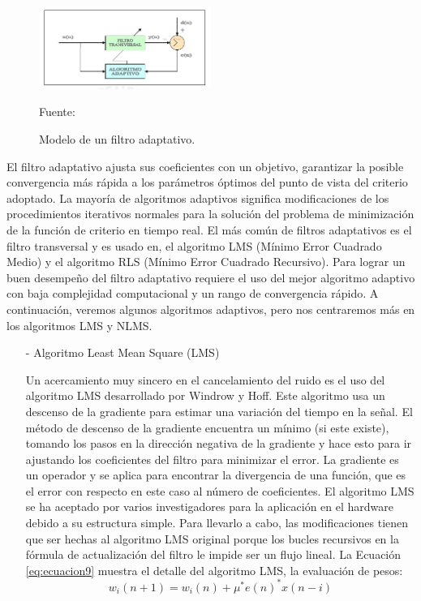 \begin{enumerate}
\begin{enumerate}
\begin{figure}[ht]
\begin{center}
\includegraphics[width=0.5\textwidth]{Imagenes/Cap2/image018}
\end{center}
\begin{center}
\vskip -0.5cm
\caption{\small{Modelo de un filtro adaptativo.}}
\label{fig:figura2.18}
{\small{Fuente: \cite{simon}}}
\end{center}
\end{figure}

El filtro adaptativo ajusta sus coeficientes con un objetivo, garantizar la posible convergencia más rápida a los parámetros óptimos del punto de vista del criterio adoptado. La mayoría de algoritmos adaptivos significa modificaciones de los procedimientos iterativos normales para la solución del problema de minimización de la función de criterio en tiempo real. El más común de filtros adaptativos es el filtro transversal y es usado en, el algoritmo LMS (Mínimo Error Cuadrado Medio) y el algoritmo RLS (Mínimo Error Cuadrado Recursivo). Para lograr un buen desempeño del filtro adaptativo requiere el uso del mejor algoritmo adaptivo con baja complejidad computacional y un rango de convergencia rápido. A continuación, veremos algunos algoritmos adaptivos, pero nos centraremos más en los algoritmos LMS y NLMS.

\begin{enumerate}
\item[-]Algoritmo Least Mean Square (LMS)
\par
Un acercamiento muy sincero en el cancelamiento del ruido es el uso del algoritmo LMS desarrollado por Windrow y Hoff. Este algoritmo usa un descenso de la gradiente para estimar una variación del tiempo en la señal. El método de descenso de la gradiente encuentra un mínimo (si este existe), tomando los pasos en la dirección negativa de la gradiente y hace esto para ir ajustando los coeficientes del filtro para minimizar el error. La gradiente es un operador y se aplica para encontrar la divergencia de una función, que es el error con respecto en este caso al número de coeficientes. 
\vskip 0.5cm
El algoritmo LMS se ha aceptado por varios investigadores para la aplicación en el hardware debido a su estructura simple. Para llevarlo a cabo, las modificaciones tienen que ser hechas al algoritmo LMS original porque los bucles recursivos en la fórmula de actualización del filtro le impide ser un flujo lineal.
\vskip 0.5cm
La Ecuación \ref{eq:ecuacion9} muestra el detalle del algoritmo LMS, la evaluación de pesos:
\begin{equation}
\label{eq:ecuacion9}
w_{i}(n+1) = w_{i}(n) + \mu^{*}e(n)^{*}x(n-i)
\end{equation}


\end{enumerate}
\end{enumerate}
\end{enumerate}
